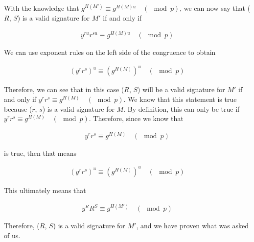 \documentclass[11pt]{article}
\theoremstyle{definition}
\begin{document}
\begin{enumerate}
\begin{enumerate}
With the knowledge that $g^{H(M')} \equiv g^{H(M)u} \quad (\mod{p})$, we can now say that ($R$, $S$) is a valid signature for $M'$ if and only if

\begin{align*}
    y^{ru}r^{su} \equiv g^{H(M)u} \quad (\mod{p})
\end{align*}

We can use exponent rules on the left side of the congruence to obtain

\begin{align*}
    (y^rr^s)^u \equiv (g^{H(M)})^u \quad (\mod{p})
\end{align*}

Therefore, we can see that in this case ($R$, $S$) will be a valid signature for $M'$ if and only if $y^rr^s \equiv g^{H(M)} \quad (\mod{p})$. We know that this statement is true because ($r$, $s$) is a valid signature for $M$. By definition, this can only be true if $y^rr^s \equiv g^{H(M)} \quad (\mod{p})$. Therefore, since we know that

\begin{align*}
    y^rr^s \equiv g^{H(M)} \quad (\mod{p})
\end{align*}

is true, then that means 

\begin{align*}
    (y^rr^s)^u \equiv (g^{H(M)})^u \quad (\mod{p})
\end{align*}

This ultimately means that

\begin{align*}
    y^RR^S \equiv g^{H(M')} \quad (\mod{p})
\end{align*}

Therefore, ($R$, $S$) is a valid signature for $M'$, and we have proven what was asked of us.

\end{enumerate}
\end{enumerate}
\end{document}
